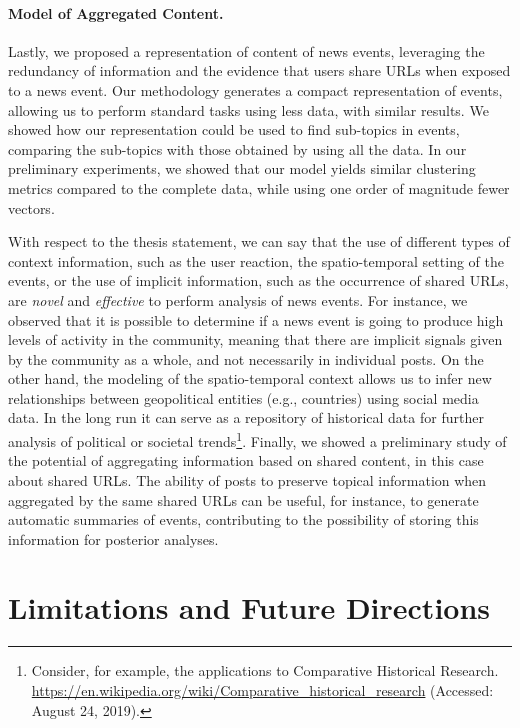 \paragraph{Model of Aggregated Content.}
%
Lastly, we proposed a representation of content of news events, leveraging the
redundancy of information and the evidence that users share URLs when exposed to
a news event.
%
Our methodology generates a compact representation of events, allowing us to
perform standard tasks using less data, with similar results.
%
We showed how our representation could be used to find sub-topics in events,
comparing the sub-topics with those obtained by using all the data.
%
In our preliminary experiments, we showed that our model yields similar
clustering metrics compared to the complete data, while using one order of
magnitude fewer vectors.


With respect to the thesis statement, we can say that the use of different types
of context information, such as the user reaction, the spatio-temporal setting
of the events, or the use of implicit information, such as the occurrence of
shared URLs, are {\em novel} and {\em effective} to perform analysis of news events. 
%
For instance, we observed that it is possible to determine if a news event is
going to produce high levels of activity in the community, meaning that there
are implicit signals given by the community as a whole, and not necessarily in
individual posts.
%
On the other hand, the modeling of the spatio-temporal context allows us to
infer new relationships between geopolitical entities (e.g., countries) using
social media data.
%
In the long run it can serve as a repository of historical data for further
analysis of political or societal trends\footnote{Consider, for example, the
applications to Comparative Historical Research.
\url{https://en.wikipedia.org/wiki/Comparative_historical_research} (Accessed:
August 24, 2019).}.
%
Finally, we showed a preliminary study of the potential of aggregating
information based on shared content, in this case about shared URLs.
%
The ability of posts to preserve topical information when aggregated by the same
shared URLs can be useful, for instance, to generate automatic summaries of
events, contributing to the possibility of storing this information for posterior
analyses.




\section{Limitations and Future Directions}

